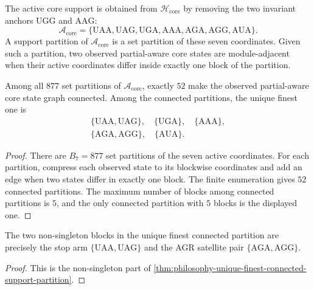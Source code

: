 \begin{definition}
\label{def:philosophy-active-core-support-partition}
The active core support is obtained from
$\mathcal H_{\mathrm{core}}$ by removing the two invariant anchors
$\mathrm{UGG}$ and $\mathrm{AAG}$:
$$
  \mathcal A_{\mathrm{core}}
  =
  \{\mathrm{UAA},\mathrm{UAG},\mathrm{UGA},
    \mathrm{AAA},\mathrm{AGA},\mathrm{AGG},\mathrm{AUA}\}.
$$
A support partition of $\mathcal A_{\mathrm{core}}$ is a set partition
of these seven coordinates. Given such a partition, two observed
partial-aware core states are module-adjacent when their active
coordinates differ inside exactly one block of the partition.
\end{definition}

\begin{theorem}
\label{thm:philosophy-unique-finest-connected-support-partition}
Among all $877$ set partitions of $\mathcal A_{\mathrm{core}}$, exactly
$52$ make the observed partial-aware core state graph connected. Among
the connected partitions, the unique finest one is
$$
\begin{gathered}
  \{\mathrm{UAA},\mathrm{UAG}\},\quad
  \{\mathrm{UGA}\},\quad
  \{\mathrm{AAA}\},\\
  \{\mathrm{AGA},\mathrm{AGG}\},\quad
  \{\mathrm{AUA}\}.
\end{gathered}
$$
\end{theorem}
\begin{proof}
There are $B_{7}=877$ set partitions of the seven active coordinates.
For each partition, compress each observed state to its blockwise
coordinates and add an edge when two states differ in exactly one block.
The finite enumeration gives $52$ connected partitions. The maximum
number of blocks among connected partitions is $5$, and the only
connected partition with $5$ blocks is the displayed one.
\end{proof}

\begin{corollary}
\label{cor:philosophy-stoparm-agr-forced-blocks}
The two non-singleton blocks in the unique finest connected partition
are precisely the stop arm $\{\mathrm{UAA},\mathrm{UAG}\}$ and the AGR
satellite pair $\{\mathrm{AGA},\mathrm{AGG}\}$.
\end{corollary}
\begin{proof}
This is the non-singleton part of
\autoref{thm:philosophy-unique-finest-connected-support-partition}.
\end{proof}


